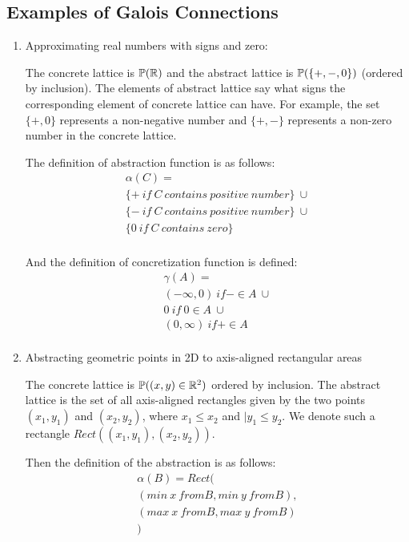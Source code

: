 \subsection*{Examples of Galois Connections}
\begin{enumerate}
    \item Approximating real numbers with signs and zero:

    The concrete lattice is $\mathbb{P}(\mathbb{R})$ and the abstract lattice is $\mathbb{P}(\{+, -, 0\})$ (ordered by
    inclusion).
    The elements of abstract lattice say what signs the corresponding element of concrete lattice can have.
    For example, the set $\{+, 0\}$ represents a non-negative number and $\{+, -\}$ represents a non-zero number in the
    concrete lattice.

    The definition of abstraction function is as follows:
    \begin{gather*}
        \alpha(C) =\\
        \{+ \: if \: C \: contains \: positive \: number\} \: \cup\\
        \{- \: if \: C \: contains \: positive \: number\} \: \cup\\
        \{0 \: if \: C \: contains \: zero\}\\
    \end{gather*}

    And the definition of concretization function is defined:
    \begin{gather*}
        \gamma(A) =\\
        (-\infty, 0) \: if - \in A \: \cup\\
        {0} \: if \: 0 \in A \: \cup\\
        (0, \infty) \: if + \in A \: \\
    \end{gather*}


    \item Abstracting geometric points in 2D to axis-aligned rectangular areas

    The concrete lattice is $\mathbb{P}((x,y) \in \mathbb{R}^2)$ ordered by inclusion.
    The abstract lattice is the set of all axis-aligned rectangles given by the two points $(x_1,y_1)$ and $(x_2,y_2)$,
    where $x_1 \leq x_2$ and $|y_1 \leq y_2$.
    We denote such a rectangle $Rect((x_1,y_1),(x_2,y_2))$.

    Then the definition of the abstraction is as follows:
    \begin{gather*}
        \alpha(B) = Rect ( \\
            (min\: x \: from B, min \: y \: from B), \\
            (max \: x \: from B, max \: y \: from B) \\
        )
    \end{gather*}


\end{enumerate}
